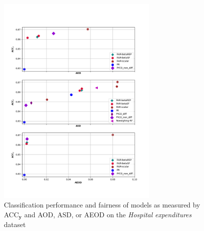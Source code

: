 \documentclass[preprint,12pt]{elsarticle}
\begin{document}
\begin{figure}
	\center
	\includegraphics[angle=0, width=0.7\textwidth]{MEPS19_ACC.png}
	\captionsetup{justification=centering}
	\caption{Classification performance and fairness of models as measured by ACC$_\mathbf{y}$ and AOD, ASD, or AEOD on the \textit{Hospital expenditures} dataset}
	\label{fig:MEPS19}
	\vskip -0.2in
\end{figure}
\end{document}
